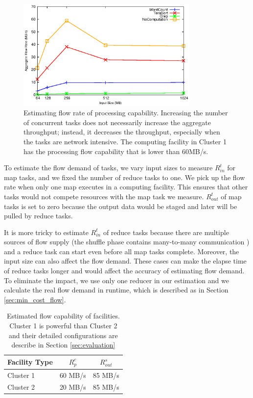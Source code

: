 \begin{figure}[ht]
    \centering
    \includegraphics[width=0.8\textwidth]{figures/flow_rate_processing.eps}
    \caption{Estimating flow rate of processing capability.  Increasing the number of concurrent tasks does not necessarily increase the aggregate throughput; instead, it decreases the throughput, especially when the tasks are network intensive.  The computing facility in Cluster 1 has the processing flow capability that is lower than 60MB/s.}
    \label{fig:processing_flow_capability}
\end{figure}


To estimate the flow demand of tasks, we vary input sizes to measure $R^{t}_{in}$ for map tasks, and we fixed the number of reduce tasks to one.
We pick up the flow rate when only one map executes in a computing facility.
This ensures that other tasks would not compete resources with the map task we measure.
$R^{t}_{out}$ of map tasks is set to zero because the output data would be staged and later will be pulled by reduce tasks.

It is more tricky to estimate $R^{t}_{in}$ of reduce tasks because there are multiple sources of flow supply (the shuffle phase contains many-to-many communication \cite{ChowdhuryM2011_Orchestra}) and a reduce task can start even before all map tasks complete.
Moreover, the input size can also affect the flow demand.
These cases can make the elapse time of reduce tasks longer and would affect the accuracy of estimating flow demand.
To eliminate the impact, we use only one reducer in our estimation and we calculate the real flow demand in runtime, which is described as in Section \ref{sec:min_cost_flow}.

\begin{table}[htp]
\caption{Estimated flow capability of facilities. Cluster 1 is powerful than Cluster 2 and their detailed configurations are describe in Section \ref{sec:evaluation}}
\begin{center}
\begin{tabular}{ | l || c | c | }
\hline
Facility Type & $R^{c}_{p}$ & $R^{s}_{out}$ \\
\hline
Cluster 1 & 60 MB/s & 85 MB/s \\
\hline
Cluster 2 & 20 MB/s & 85 MB/s \\
\hline
\end{tabular}
\end{center}
\label{tab:flow_capability}
\end{table}

